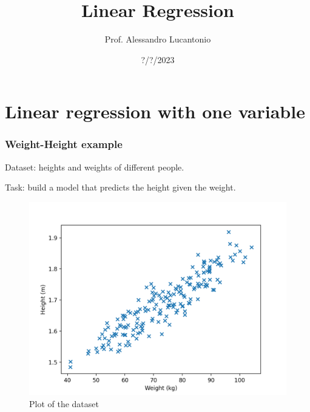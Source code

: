 \documentclass{beamer}
\title{Linear Regression}
\author{Prof. Alessandro Lucantonio}
\institute{Aarhus University - Department of Mechanical and Production Engineering}
\date{?/?/2023}
\begin{document}
	
	\frame{\titlepage}
	
	\section{Linear regression with one variable}

	\begin{frame}
		\frametitle{Weight-Height example}
		Dataset: heights and weights of different people.
		
		Task: build a model that predicts the height given the weight. 
		
		\begin{figure}
			\centering
			\includegraphics[scale=0.5]{images/linear_regression_data}
			\caption{Plot of the dataset}
		\end{figure}
	\end{frame}
\end{document}
